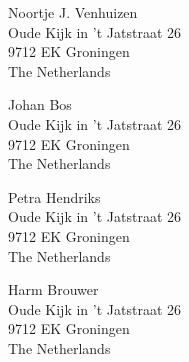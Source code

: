 \documentclass{salt}
\begin{document}

\newpage %



\begin{addresses}
  \begin{address}
    Noortje J. Venhuizen \\
    Oude Kijk in 't Jatstraat 26\\
    9712 EK Groningen\\
    The Netherlands \\
  \end{address}
  \begin{address}
    Johan Bos \\
    Oude Kijk in 't Jatstraat 26\\
    9712 EK Groningen\\
    The Netherlands \\
  \end{address}
  \begin{address}
    Petra Hendriks \\
    Oude Kijk in 't Jatstraat 26\\
    9712 EK Groningen\\
    The Netherlands \\
  \end{address}
  \begin{address}
    Harm Brouwer \\
    Oude Kijk in 't Jatstraat 26\\
    9712 EK Groningen\\
    The Netherlands \\
  \end{address}
\end{addresses}

\end{document}
